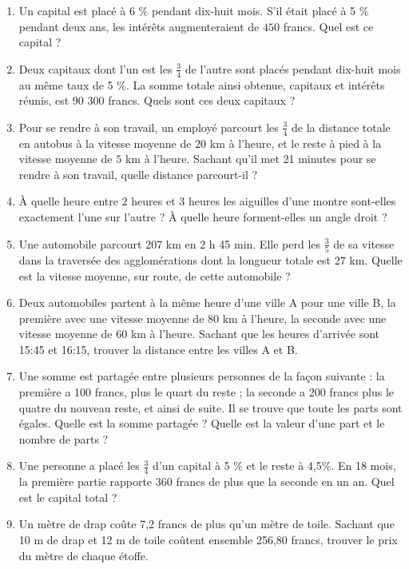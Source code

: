 \documentclass[12 pt]{extarticle}
\theoremstyle{plain}
\begin{document}
\begin{enumerate}
 \item Un capital est placé à $6$ \% pendant dix-huit mois. S'il était placé à 5 \% pendant deux ans, les intérêts augmenteraient de $450$ francs. Quel est ce capital ? 
 \item Deux capitaux dont l'un est les $\frac34$ de l'autre sont placés pendant dix-huit mois au même taux de 5 \%. La somme totale ainsi obtenue, capitaux et intérêts réunis, est 90 300 francs. Quels sont ces deux capitaux ? 
 \item Pour se rendre à son travail, un employé parcourt les $\frac34$ de la distance totale en autobus à la vitesse moyenne de $20$ km à l'heure, et le reste à pied à la vitesse moyenne de $5$ km à l'heure. Sachant qu'il met 21 minutes pour se rendre à son travail, quelle distance parcourt-il ? 
 \item À quelle heure entre $2$ heures et $3$ heures les aiguilles d'une montre sont-elles exactement l'une sur l'autre ? À quelle heure forment-elles un angle droit ? 
 \item Une automobile parcourt 207 km en 2 h 45 min. Elle perd les $\frac35$ de sa vitesse dans la traversée des agglomérations dont la longueur totale est $27$ km. Quelle est la vitesse moyenne, sur route, de cette automobile ? 
 \item Deux automobiles partent à la même heure d'une ville A pour une ville B, la première avec une vitesse moyenne de $80$ km à l'heure, la seconde avec une vitesse moyenne de 60 km à l'heure. Sachant que les heures d'arrivée sont 15:45 et 16:15, trouver la distance entre les villes A et B. 
 \item Une somme est partagée entre plusieurs personnes de la façon suivante : la première a 100 francs, plus le quart du reste ; la seconde a 200 francs plus le quatre du nouveau reste, et ainsi de suite. Il se trouve que toute les parts sont égales. Quelle est la somme partagée ? Quelle est la valeur d'une part et le nombre de parts ? 
 \item Une personne a placé les $\frac34$ d'un capital à 5 \% et le reste à 4,5\%. En 18 mois, la première partie rapporte 360 francs de plus que la seconde en un an. Quel est le capital total ? 
 \item Un mètre de drap coûte 7,2 francs de plus qu'un mètre de toile. Sachant que 10 m de drap et 12 m de toile coûtent ensemble 256,80 francs, trouver le prix du mètre de chaque étoffe. 

\end{enumerate}
\end{document}
